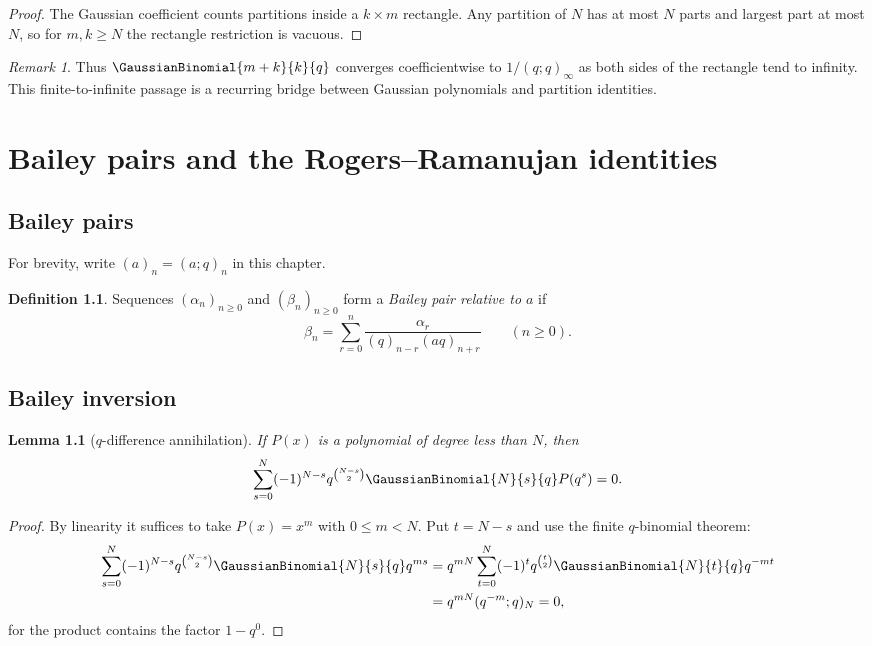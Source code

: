 \documentclass[11pt,a4paper,oneside,openany]{book}
\newtheorem{lemma}[lemma]{Lemma}
\theoremstyle{definition}
\newtheorem{definition}[definition]{Definition}
\theoremstyle{remark}
\newtheorem{remark}[remark]{Remark}
\begin{document}
\begin{proof}
The Gaussian coefficient counts partitions inside a $k\times m$ rectangle.  Any partition of $N$ has at most $N$ parts and largest part at most $N$, so for $m,k\ge N$ the rectangle restriction is vacuous.
\end{proof}

\begin{remark}
Thus $\GaussianBinomial{m+k}{k}{q}$ converges coefficientwise to $1/(q;q)_\infty$ as both sides of the rectangle tend to infinity.  This finite-to-infinite passage is a recurring bridge between Gaussian polynomials and partition identities.
\end{remark}

\chapter{Bailey pairs and the Rogers--Ramanujan identities}\label{chap:bailey}

\section{Bailey pairs}

For brevity, write $(a)_n=(a;q)_n$ in this chapter.

\begin{definition}
Sequences $(\alpha_n)_{n\ge0}$ and $(\beta_n)_{n\ge0}$ form a \emph{Bailey pair relative to $a$} if
\[
 \beta_n=\sum_{r=0}^{n}\frac{\alpha_r}{(q)_{n-r}(aq)_{n+r}}
 \qquad(n\ge0).
\]
\end{definition}

\section{Bailey inversion}

\begin{lemma}[$q$-difference annihilation]\label{lem:qdiff-annihilation}
If $P(x)$ is a polynomial of degree less than $N$, then
\[
 \sum_{s=0}^{N}(-1)^{N-s}q^{\binom{N-s}{2}}
 \GaussianBinomial{N}{s}{q} P(q^s)=0.
\]
\end{lemma}

\begin{proof}
By linearity it suffices to take $P(x)=x^m$ with $0\le m<N$.  Put $t=N-s$ and use the finite $q$-binomial theorem:
\begin{align*}
 \sum_{s=0}^{N}(-1)^{N-s}q^{\binom{N-s}{2}}\GaussianBinomial{N}{s}{q} q^{ms}
 &=q^{mN}\sum_{t=0}^{N}(-1)^tq^{\binom t2}\GaussianBinomial{N}{t}{q}q^{-mt}\\
 &=q^{mN}(q^{-m};q)_N=0,
\end{align*}
for the product contains the factor $1-q^0$.
\end{proof}
\end{document}
